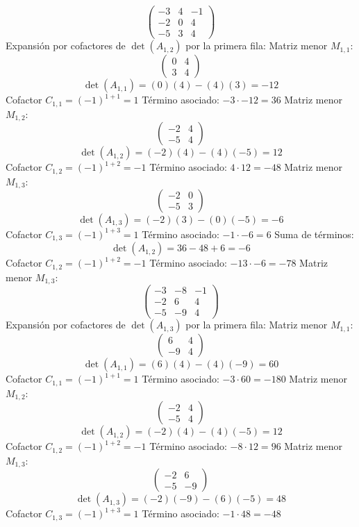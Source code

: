 \documentclass{article}
\begin{document}
\[\begin{pmatrix}-3 & 4 & -1 \\ -2 & 0 & 4 \\ -5 & 3 & 4\end{pmatrix}\]
Expansión por cofactores de $\det(A_{1,2})$ por la primera fila:
Matriz menor $M_{1,1}$:
\[\begin{pmatrix}0 & 4 \\ 3 & 4\end{pmatrix}\]
\[\det(A_{1,1}) = (0)(4) - (4)(3) = -12\]
Cofactor $C_{1,1} = (-1)^{1+1} = 1$
Término asociado: $ -3 \cdot -12 = 36 $
Matriz menor $M_{1,2}$:
\[\begin{pmatrix}-2 & 4 \\ -5 & 4\end{pmatrix}\]
\[\det(A_{1,2}) = (-2)(4) - (4)(-5) = 12\]
Cofactor $C_{1,2} = (-1)^{1+2} = -1$
Término asociado: $ 4 \cdot 12 = -48 $
Matriz menor $M_{1,3}$:
\[\begin{pmatrix}-2 & 0 \\ -5 & 3\end{pmatrix}\]
\[\det(A_{1,3}) = (-2)(3) - (0)(-5) = -6\]
Cofactor $C_{1,3} = (-1)^{1+3} = 1$
Término asociado: $ -1 \cdot -6 = 6 $
Suma de términos:
\[\det(A_{1,2}) = 36 - 48 + 6 = -6\]
Cofactor $C_{1,2} = (-1)^{1+2} = -1$
Término asociado: $ -13 \cdot -6 = -78 $
Matriz menor $M_{1,3}$:
\[\begin{pmatrix}-3 & -8 & -1 \\ -2 & 6 & 4 \\ -5 & -9 & 4\end{pmatrix}\]
Expansión por cofactores de $\det(A_{1,3})$ por la primera fila:
Matriz menor $M_{1,1}$:
\[\begin{pmatrix}6 & 4 \\ -9 & 4\end{pmatrix}\]
\[\det(A_{1,1}) = (6)(4) - (4)(-9) = 60\]
Cofactor $C_{1,1} = (-1)^{1+1} = 1$
Término asociado: $ -3 \cdot 60 = -180 $
Matriz menor $M_{1,2}$:
\[\begin{pmatrix}-2 & 4 \\ -5 & 4\end{pmatrix}\]
\[\det(A_{1,2}) = (-2)(4) - (4)(-5) = 12\]
Cofactor $C_{1,2} = (-1)^{1+2} = -1$
Término asociado: $ -8 \cdot 12 = 96 $
Matriz menor $M_{1,3}$:
\[\begin{pmatrix}-2 & 6 \\ -5 & -9\end{pmatrix}\]
\[\det(A_{1,3}) = (-2)(-9) - (6)(-5) = 48\]
Cofactor $C_{1,3} = (-1)^{1+3} = 1$
Término asociado: $ -1 \cdot 48 = -48 $
\end{document}
